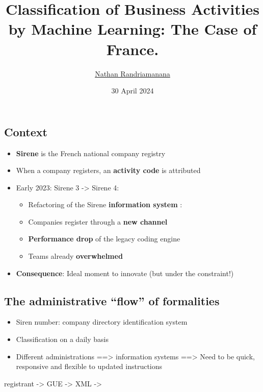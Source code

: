 \documentclass[
  letterpaper,
  DIV=11,
  numbers=noendperiod]{scrartcl}
\title{Classification of Business Activities by Machine Learning: The
Case of France.}
\author{\href{https://github.com/TheAIWizard}{Nathan Randriamanana}}
\date{30 April 2024}
\providecommand{\tightlist}{%
  \setlength{\itemsep}{0pt}\setlength{\parskip}{0pt}}\usepackage{longtable,booktabs,array}
\begin{document}
\maketitle

\subsection{Context}\label{context}

\begin{itemize}
\tightlist
\item
  {\textbf{Sirene}} is the French national company registry
\item
  When a company registers, an {\textbf{activity code}} is attributed
\item
  Early 2023: Sirene 3 -\textgreater{} Sirene 4:

  \begin{itemize}
  \tightlist
  \item
    Refactoring of the Sirene {\textbf{information system}} :
  \item
    Companies register through a {\textbf{new channel}}
  \item
    {\textbf{Performance drop}} of the legacy coding engine
  \item
    Teams already {\textbf{overwhelmed}}
  \end{itemize}
\item
  {\textbf{Consequence}}: Ideal moment to innovate (but under the
  constraint!)
\end{itemize}

\subsection{The administrative ``flow'' of
formalities}\label{the-administrative-flow-of-formalities}

\begin{itemize}
\tightlist
\item
  Siren number: company directory identification system
\item
  Classification on a daily basis
\item
  Different administrations ==\textgreater{} information systems
  ==\textgreater{} Need to be quick, responsive and flexible to updated
  instructions
\end{itemize}

registrant -\textgreater{} GUE -\textgreater{} XML -\textgreater{}
\end{document}
